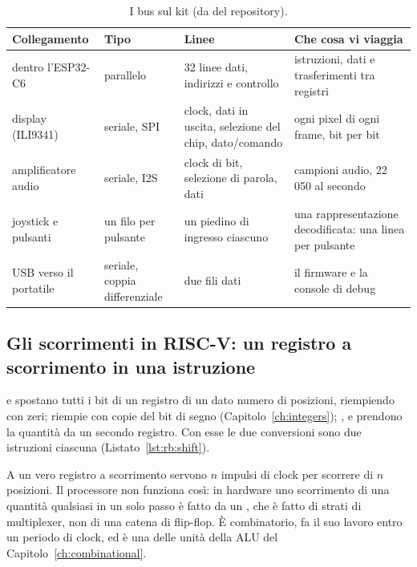 \begin{table}[htb]
\centering\small
\caption{I bus sul kit \prg (da  del
repository).}\label{tab:rb:kit}
\begin{tabularx}{\textwidth}{@{}P{0.21\textwidth}P{0.16\textwidth}LL@{}}
\toprule
\textbf{Collegamento} & \textbf{Tipo} & \textbf{Linee} & \textbf{Che cosa vi viaggia}\\
\midrule
dentro l'ESP32-C6 & parallelo & 32 linee dati, indirizzi e controllo & istruzioni, dati e trasferimenti tra registri\\
display (ILI9341) & seriale, SPI & clock, dati in uscita, selezione del chip, dato/comando & ogni pixel di ogni frame, bit per bit\\
amplificatore audio & seriale, I2S & clock di bit, selezione di parola, dati & campioni audio, 22\,050 al secondo\\
joystick e pulsanti & un filo per pulsante & un piedino di ingresso ciascuno & una rappresentazione decodificata: una linea per pulsante\\
USB verso il portatile & seriale, coppia differenziale & due fili dati & il firmware e la console di debug\\
\bottomrule
\end{tabularx}
\end{table}

\subsection{Gli scorrimenti in RISC-V: un registro a scorrimento in una istruzione}

 e  spostano tutti i bit di un registro di un dato numero
di posizioni, riempiendo con zeri;  riempie con copie del bit di
segno (Capitolo~\ref{ch:integers}); ,  e  prendono
la quantità da un secondo registro. Con esse le due conversioni sono due
istruzioni ciascuna (Listato~\ref{lst:rb:shift}).


A un vero registro a scorrimento servono $n$ impulsi di clock per scorrere di
$n$ posizioni. Il processore non funziona così: in hardware uno scorrimento di
una quantità qualsiasi in un solo passo è fatto da un ,
che è fatto di strati di multiplexer, non di una catena di flip-flop. È
combinatorio, fa il suo lavoro entro un periodo di clock, ed è una delle unità
della ALU del Capitolo~\ref{ch:combinational}.

